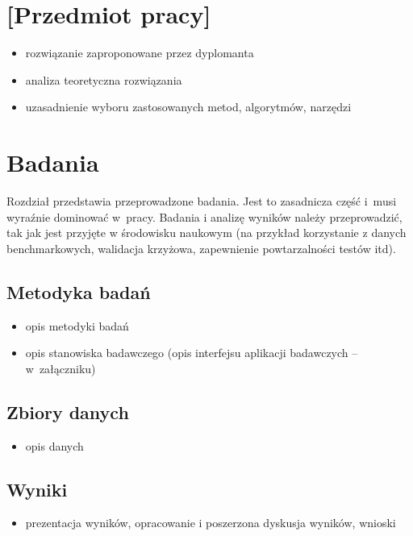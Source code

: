 \documentclass[a4paper,twoside,12pt]{book}
\begin{document}
\chapter{[Przedmiot pracy]}

\begin{itemize}
\item rozwiązanie zaproponowane przez dyplomanta
\item analiza teoretyczna rozwiązania
\item uzasadnienie wyboru zastosowanych metod, algorytmów, narzędzi
\end{itemize}

\chapter{Badania}

 

Rozdział przedstawia przeprowadzone badania. Jest to zasadnicza część i~musi wyraźnie dominować w~pracy.
Badania i analizę wyników należy przeprowadzić, tak jak jest przyjęte w środowisku naukowym (na przykład korzystanie z danych benchmarkowych, walidacja krzyżowa, zapewnienie powtarzalności testów itd). 

\section{Metodyka badań}

\begin{itemize}
\item opis metodyki badań
\item opis stanowiska badawczego (opis interfejsu aplikacji badawczych -- w~załączniku)
\end{itemize}


\section{Zbiory danych}

\begin{itemize}
\item opis danych
\end{itemize}


\section{Wyniki}

\begin{itemize}
\item prezentacja wyników, opracowanie i poszerzona dyskusja  wyników, wnioski
\end{itemize}
\end{document}
